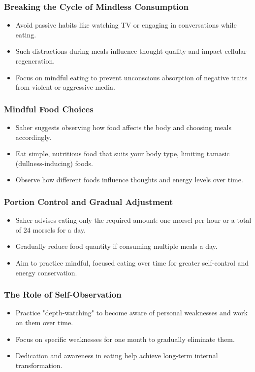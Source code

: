 \begin{frame}[fragile]\frametitle{Breaking the Cycle of Mindless Consumption}
    \begin{itemize}
        \item Avoid passive habits like watching TV or engaging in conversations while eating.
        \item Such distractions during meals influence thought quality and impact cellular regeneration.
        \item Focus on mindful eating to prevent unconscious absorption of negative traits from violent or aggressive media.
    \end{itemize}
\end{frame}

\begin{frame}[fragile]\frametitle{Mindful Food Choices}
    \begin{itemize}
        \item Saher suggests observing how food affects the body and choosing meals accordingly.
        \item Eat simple, nutritious food that suits your body type, limiting tamasic (dullness-inducing) foods.
        \item Observe how different foods influence thoughts and energy levels over time.
    \end{itemize}
\end{frame}

\begin{frame}[fragile]\frametitle{Portion Control and Gradual Adjustment}
    \begin{itemize}
        \item Saher advises eating only the required amount: one morsel per hour or a total of 24 morsels for a day.
        \item Gradually reduce food quantity if consuming multiple meals a day.
        \item Aim to practice mindful, focused eating over time for greater self-control and energy conservation.
    \end{itemize}
\end{frame}

\begin{frame}[fragile]\frametitle{The Role of Self-Observation}
    \begin{itemize}
        \item Practice "depth-watching" to become aware of personal weaknesses and work on them over time.
        \item Focus on specific weaknesses for one month to gradually eliminate them.
        \item Dedication and awareness in eating help achieve long-term internal transformation.
    \end{itemize}
\end{frame}

